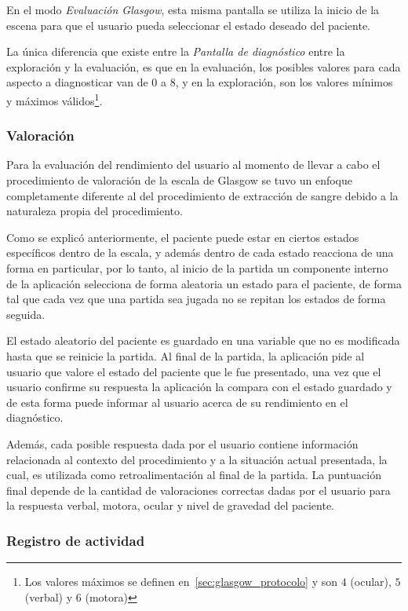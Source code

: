 En el modo \emph{Evaluación Glasgow}, esta misma pantalla se utiliza la inicio
de la escena para que el usuario pueda seleccionar el estado deseado del
paciente.

La única diferencia que existe entre la \emph{Pantalla de diagnóstico} entre la
exploración y la evaluación, es que en la evaluación, los posibles valores para
cada aspecto a diagnosticar van de $0$ a $8$, y en la exploración, son los
valores mínimos y máximos válidos\footnote{Los valores máximos se definen
    en~\ref{sec:glasgow_protocolo} y son $4$ (ocular), $5$ (verbal) y $6$
    (motora)}.

\subsubsection{Valoración}
\label{sec:puntuacion_glasgow}

Para la evaluación del rendimiento del usuario al momento de llevar a cabo el
procedimiento de valoración de la escala de Glasgow se tuvo un enfoque
completamente diferente al del procedimiento de extracción de sangre debido a la
naturaleza propia del procedimiento. 

Como se explicó anteriormente, el paciente puede estar en ciertos estados
específicos dentro de la escala, y además dentro de cada estado reacciona de una
forma en particular, por lo tanto, al inicio de la partida un componente interno
de la aplicación selecciona de forma aleatoria un estado para el paciente, de
forma tal que cada vez que una partida sea jugada no se repitan los estados de
forma seguida.

El estado aleatorio del paciente es guardado en una variable que no es
modificada hasta que se reinicie la partida. Al final de la partida, la
aplicación pide al usuario que valore el estado del paciente que le fue
presentado, una vez que el usuario confirme su respuesta la aplicación la
compara con el estado guardado y de esta forma puede informar al usuario acerca
de su rendimiento en el diagnóstico.

Además, cada posible respuesta dada por el usuario contiene información
relacionada al contexto del procedimiento y a la situación actual presentada, la
cual, es utilizada como retroalimentación al final de la partida. La puntuación
final depende de la cantidad de valoraciones correctas dadas por el usuario
para la respuesta verbal, motora, ocular y nivel de gravedad del paciente.

\subsubsection{Registro de actividad}


